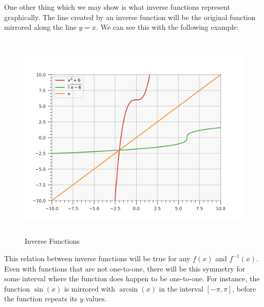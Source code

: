 \documentclass[12pt]{article}
\begin{document}
One other thing which we may show is what inverse functions represent graphically.
The line created by an inverse function will be the original function mirrored along the line $y=x$.
We can see this with the following example:

\begin{figure}[H]
    \centering
    \includegraphics[width=12.5cm, height=10cm]{inverse_functions.png}
    \caption{Inverse Functions}
    \label{fig:fig1}
\end{figure}

This relation between inverse functions will be true for any $f(x)$ and $f^{-1}(x)$.
Even with functions that are not one-to-one, there will be this symmetry for some interval where the function does happen to be one-to-one.
For instance, the function $\sin(x)$ is mirrored with $\arcsin(x)$ in the interval $[-\pi, \pi]$, before the function repeats its $y$ values.
\end{document}
